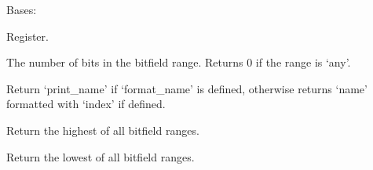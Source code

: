 \documentclass[letterpaper,10pt,english]{sphinxmanual}
\begin{document}

\begin{fulllineitems}
\label{\detokenize{developer:wuppercodegen.classes.Register}}
Bases: {\hyperref[\detokenize{developer:wuppercodegen.classes.Entry}]{}}

Register.

\begin{fulllineitems}
\label{\detokenize{developer:wuppercodegen.classes.Register.bits}}
The number of bits in the bitfield range. Returns 0 if the range is `any'.

\end{fulllineitems}


\begin{fulllineitems}
\label{\detokenize{developer:wuppercodegen.classes.Register.full_name}}
Return `print\_name' if `format\_name' is defined, otherwise returns `name' formatted with `index' if defined.

\end{fulllineitems}


\begin{fulllineitems}
\label{\detokenize{developer:wuppercodegen.classes.Register.hi}}
Return the highest of all bitfield ranges.

\end{fulllineitems}


\begin{fulllineitems}
\label{\detokenize{developer:wuppercodegen.classes.Register.lo}}
Return the lowest of all bitfield ranges.

\end{fulllineitems}



\end{fulllineitems}
\end{document}
